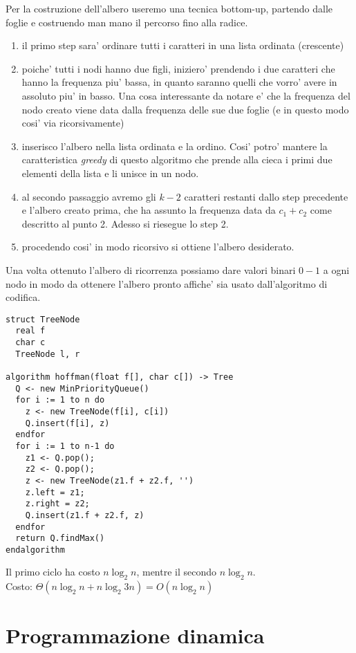 \documentclass{article}
\begin{document}
Per la costruzione dell'albero useremo una tecnica bottom-up, partendo dalle foglie
e costruendo man mano il percorso fino alla radice.
\begin{enumerate}
  \item il primo step sara' ordinare tutti i caratteri in una lista ordinata (crescente)
  \item poiche' tutti i nodi hanno due figli, iniziero' prendendo i due caratteri che
    hanno la frequenza piu' bassa, in quanto saranno quelli che vorro' avere in
    assoluto piu' in basso.
    Una cosa interessante da notare e' che la frequenza del nodo creato viene data
    dalla frequenza delle sue due foglie (e in questo modo cosi' via ricorsivamente)
  \item inserisco l'albero nella lista ordinata e la ordino. Cosi' potro' mantere
    la caratteristica \emph{greedy} di questo algoritmo che prende alla cieca i primi
    due elementi della lista e li unisce in un nodo.
  \item al secondo passaggio avremo gli $k-2$ caratteri restanti dallo step precedente
    e l'albero creato prima, che ha assunto la frequenza data da $c_1 + c_2$ come
    descritto al punto 2. Adesso si riesegue lo step 2.
  \item procedendo cosi' in modo ricorsivo si ottiene l'albero desiderato.
\end{enumerate}

Una volta ottenuto l'albero di ricorrenza possiamo dare valori binari $0-1$ a ogni
nodo in modo da ottenere l'albero pronto affiche' sia usato dall'algoritmo di codifica.

\begin{lstlisting}
struct TreeNode
  real f
  char c
  TreeNode l, r

algorithm hoffman(float f[], char c[]) -> Tree
  Q <- new MinPriorityQueue()
  for i := 1 to n do
    z <- new TreeNode(f[i], c[i])
    Q.insert(f[i], z)
  endfor
  for i := 1 to n-1 do
    z1 <- Q.pop();
    z2 <- Q.pop();
    z <- new TreeNode(z1.f + z2.f, '')
    z.left = z1;
    z.right = z2;
    Q.insert(z1.f + z2.f, z)
  endfor
  return Q.findMax()
endalgorithm
\end{lstlisting}

Il primo ciclo ha costo $n \log_2 n$, mentre il secondo $n \log_2 n$. \\
Costo: $\Theta(n\log_2 n + n \log_2 3n) = O(n \log_2 n)$

\section{Programmazione dinamica}
\end{document}
